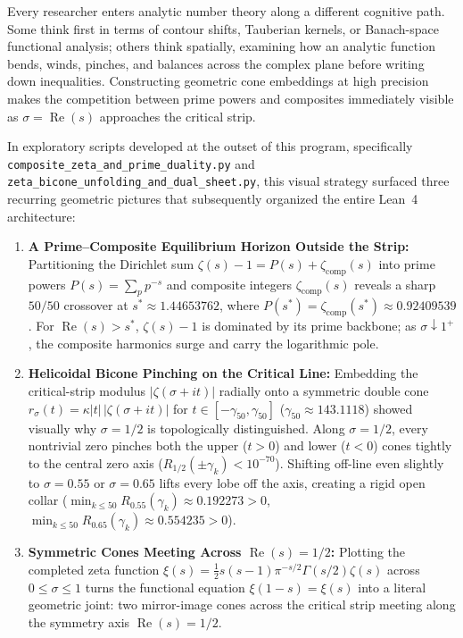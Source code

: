 \documentclass[11pt,a4paper]{article}
\begin{document}
Every researcher enters analytic number theory along a different cognitive path. Some think first in terms of contour shifts, Tauberian kernels, or Banach-space functional analysis; others think spatially, examining how an analytic function bends, winds, pinches, and balances across the complex plane before writing down inequalities. Constructing geometric cone embeddings at high precision makes the competition between prime powers and composites immediately visible as $\sigma = \operatorname{Re}(s)$ approaches the critical strip.

In exploratory scripts developed at the outset of this program, specifically \texttt{composite\_\allowbreak zeta\_\allowbreak and\_\allowbreak prime\_\allowbreak duality.py} and \texttt{zeta\_\allowbreak bicone\_\allowbreak unfolding\_\allowbreak and\_\allowbreak dual\_\allowbreak sheet.py}, this visual strategy surfaced three recurring geometric pictures that subsequently organized the entire Lean~4 architecture:
\begin{enumerate}[noitemsep]
    \item \textbf{A Prime--Composite Equilibrium Horizon Outside the Strip:} Partitioning the Dirichlet sum $\zeta(s) - 1 = P(s) + \zeta_{\mathrm{comp}}(s)$ into prime powers $P(s) = \sum_{p} p^{-s}$ and composite integers $\zeta_{\mathrm{comp}}(s)$ reveals a sharp $50/50$ crossover at $s^* \approx 1.44653762$, where $P(s^*) = \zeta_{\mathrm{comp}}(s^*) \approx 0.92409539$. For $\operatorname{Re}(s) > s^*$, $\zeta(s) - 1$ is dominated by its prime backbone; as $\sigma \downarrow 1^+$, the composite harmonics surge and carry the logarithmic pole.
    \item \textbf{Helicoidal Bicone Pinching on the Critical Line:} Embedding the critical-strip modulus $|\zeta(\sigma+it)|$ radially onto a symmetric double cone $r_\sigma(t) = \kappa |t|\,|\zeta(\sigma+it)|$ for $t \in [-\gamma_{50}, \gamma_{50}]$ ($\gamma_{50} \approx 143.1118$) showed visually why $\sigma = 1/2$ is topologically distinguished. Along $\sigma = 1/2$, every nontrivial zero pinches both the upper ($t > 0$) and lower ($t < 0$) cones tightly to the central zero axis ($R_{1/2}(\pm\gamma_k) < 10^{-70}$). Shifting off-line even slightly to $\sigma = 0.55$ or $\sigma = 0.65$ lifts every lobe off the axis, creating a rigid open collar ($\min_{k \le 50} R_{0.55}(\gamma_k) \approx 0.192273 > 0$, $\min_{k \le 50} R_{0.65}(\gamma_k) \approx 0.554235 > 0$).
    \item \textbf{Symmetric Cones Meeting Across $\operatorname{Re}(s) = 1/2$:} Plotting the completed zeta function $\xi(s) = \frac{1}{2}s(s-1)\pi^{-s/2}\Gamma(s/2)\zeta(s)$ across $0 \le \sigma \le 1$ turns the functional equation $\xi(1-s) = \xi(s)$ into a literal geometric joint: two mirror-image cones across the critical strip meeting along the symmetry axis $\operatorname{Re}(s) = 1/2$.
\end{enumerate}
\end{document}
